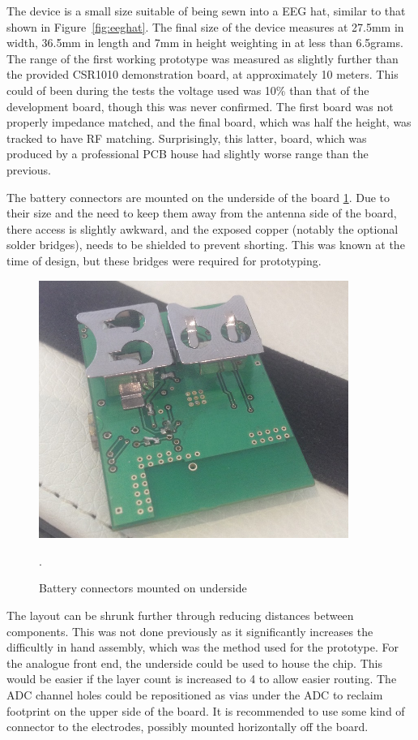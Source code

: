 \documentclass[]{article}
\begin{document}
The device is a small size suitable of being sewn into a \ac{EEG} hat, similar to that shown in Figure~\ref{fig:eeghat}. The final size of the device measures at 27.5mm in width, 36.5mm in length  and 7mm in height weighting in at less than 6.5grams. The range of the first working prototype was measured as slightly further than the provided CSR1010 demonstration board, at approximately 10 meters. This could of been during the tests the voltage used was 10\% than that of the development board, though this was never confirmed. The first board was not properly impedance matched, and the final board, which was half the height, was tracked to have RF matching. Surprisingly, this latter, board, which was produced by a professional \ac{PCB} house had slightly worse range than the previous. 

The battery connectors are mounted on the underside of the board \ref{fig:bat}. Due to their size and the need to keep them away from the antenna side of the board, there access is slightly awkward, and the exposed copper (notably the optional solder bridges), needs to be shielded to prevent shorting. This was known at the time of design, but these bridges were required for prototyping. 

\begin{figure}[H]
	\begin{center}
		\includegraphics[width = 0.9\textwidth]{bat}
	\end{center}
	\caption{Battery connectors mounted on underside}. 
	\label{fig:bat}
\end{figure}

The layout can be shrunk further through reducing distances between components. This was not done previously as it significantly increases the difficultly in hand assembly, which was the method used for the prototype. For the analogue front end, the underside could be used to house the chip. This would be easier if the layer count is increased to 4 to allow easier routing. The \ac{ADC} channel holes could be repositioned as vias under the \ac{ADC} to reclaim footprint on the upper side of the board. It is recommended to use some kind of connector to the electrodes, possibly mounted horizontally off the board.
\end{document}
